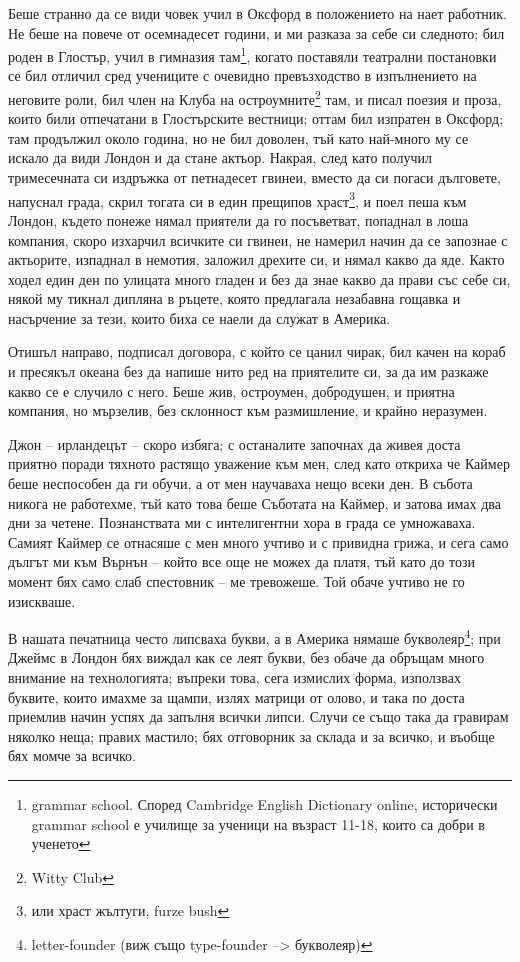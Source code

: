 \documentclass[12pt]{book}
\begin{document}
Беше странно да се види човек учил в Оксфорд в положението на нает работник. Не беше на повече от осемнадесет години, и ми разказа за себе си следното; бил роден в Глостър, учил в гимназия там\footnote{grammar school. Според Cambridge English Dictionary online, исторически grammar school е училище за ученици на възраст 11-18, които са добри в ученето}, когато поставяли театрални постановки се бил отличил сред учениците с очевидно превъзходство в изпълнението на неговите роли, бил член на Клуба на остроумните\footnote{Witty Club} там, и писал поезия и проза, които били отпечатани в Глостърските вестници; оттам бил изпратен в Оксфорд; там продължил около година, но не бил доволен, тъй като най-много му се искало да види Лондон и да стане актьор. Накрая, след като получил тримесечната си издръжка от петнадесет гвинеи, вместо да си погаси дълговете, напуснал града, скрил тогата си в един прещипов храст\footnote{или храст жълтуги, furze bush}, и поел пеша към Лондон, където понеже нямал приятели да го посъветват, попаднал в лоша компания, скоро изхарчил всичките си гвинеи, не намерил начин да се запознае с актьорите, изпаднал в немотия,  заложил дрехите си, и нямал какво да яде. Както ходел един ден по улицата много гладен и без да знае какво да прави със себе си, някой му тикнал дипляна в ръцете, която предлагала незабавна гощавка и насърчение за тези, които биха се наели да служат в Америка. 

Отишъл направо, подписал договора, с който се цанил чирак, бил качен на кораб и пресякъл океана без да напише нито ред на приятелите си, за да им разкаже какво се е случило с него. Беше жив, остроумен, добродушен, и приятна компания, но мързелив, без склонност към размишление, и крайно неразумен.

Джон – ирландецът – скоро избяга; с останалите започнах да живея доста приятно поради тяхното растящо уважение към мен, след като откриха че Каймер беше неспособен да ги обучи, а от мен научаваха нещо всеки ден. В събота никога не работехме, тъй като това беше Съботата на Каймер, и затова имах два дни за четене. Познанствата ми с интелигентни хора в града се умножаваха. Самият Каймер се отнасяше с мен много учтиво и с привидна грижа, и сега само дългът ми към Върнън – който все още не можех да платя, тъй като до този момент бях само слаб спестовник – ме тревожеше. Той обаче учтиво не го изискваше.

В нашата печатница често липсваха букви, а в Америка нямаше букволеяр\footnote{letter-founder  (виж също type-founder –> букволеяр)}; при Джеймс в Лондон бях виждал как се леят букви, без обаче да обръщам много внимание на технологията; въпреки това, сега измислих форма, използвах буквите, които имахме за щампи, излях матрици от олово, и така по доста приемлив начин успях да запълня всички липси. Случи се също така да гравирам няколко неща; правих мастило; бях отговорник за склада и за всичко, и въобще бях момче за всичко.
\end{document}
